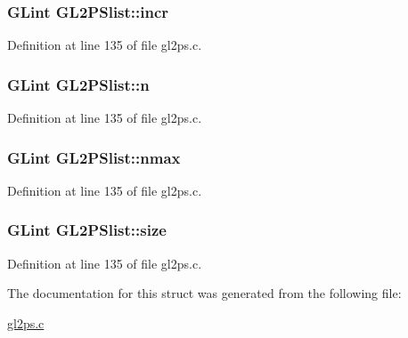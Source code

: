 \subsubsection[{incr}]{\setlength{\rightskip}{0pt plus 5cm}G\+Lint G\+L2\+P\+Slist\+::incr}\label{struct_g_l2_p_slist_aee2160e9aa439af185d48f723b1a6b59}


Definition at line 135 of file gl2ps.\+c.

\hypertarget{struct_g_l2_p_slist_a1d0803211695ce7240a1e6fa832b868e}{}
\subsubsection[{n}]{\setlength{\rightskip}{0pt plus 5cm}G\+Lint G\+L2\+P\+Slist\+::n}\label{struct_g_l2_p_slist_a1d0803211695ce7240a1e6fa832b868e}


Definition at line 135 of file gl2ps.\+c.

\hypertarget{struct_g_l2_p_slist_a5c25dd9337d4f558c344863e9bbac025}{}
\subsubsection[{nmax}]{\setlength{\rightskip}{0pt plus 5cm}G\+Lint G\+L2\+P\+Slist\+::nmax}\label{struct_g_l2_p_slist_a5c25dd9337d4f558c344863e9bbac025}


Definition at line 135 of file gl2ps.\+c.

\hypertarget{struct_g_l2_p_slist_adf2704c02cef1fb58ab86a1b3e629ec1}{}
\subsubsection[{size}]{\setlength{\rightskip}{0pt plus 5cm}G\+Lint G\+L2\+P\+Slist\+::size}\label{struct_g_l2_p_slist_adf2704c02cef1fb58ab86a1b3e629ec1}


Definition at line 135 of file gl2ps.\+c.



The documentation for this struct was generated from the following file\+:\begin{DoxyCompactItemize}
\item 
\hyperlink{gl2ps_8c}{gl2ps.\+c}\end{DoxyCompactItemize}
